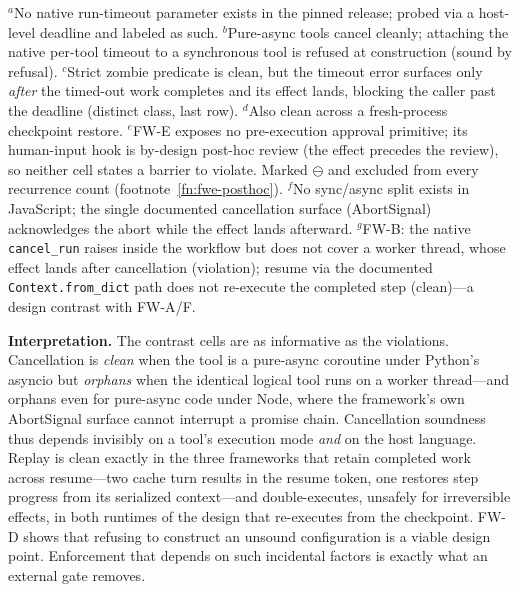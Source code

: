 \documentclass[10pt,journal,compsoc]{IEEEtran}
\begin{document}
\begin{table}[!t]
\smallskip
\raggedright\footnotesize
$^{a}$No native run-timeout parameter exists in the pinned release; probed via
a host-level deadline and labeled as such.
$^{b}$Pure-async tools cancel cleanly; attaching the native per-tool timeout to
a synchronous tool is refused at construction (sound by refusal).
$^{c}$Strict zombie predicate is clean, but the timeout error surfaces only
\emph{after} the timed-out work completes and its effect lands, blocking the
caller past the deadline (distinct class, last row).
$^{d}$Also clean across a fresh-process checkpoint restore.
$^{e}$\textsf{FW-E} exposes no pre-execution approval primitive; its human-input
hook is by-design post-hoc review (the effect precedes the review), so neither
cell states a barrier to violate. Marked $\ominus$ and excluded from every
recurrence count (footnote~\ref{fn:fwe-posthoc}).
$^{f}$No sync/async split exists in JavaScript; the single documented
cancellation surface (\textsf{AbortSignal}) acknowledges the abort while the
effect lands afterward.
$^{g}$\textsf{FW-B}: the native \texttt{cancel\_run} raises inside the
workflow but does not cover a worker thread, whose effect lands after
cancellation (violation); resume via the documented
\texttt{Context.from\_dict} path does not re-execute the completed step
(clean)---a design contrast with \textsf{FW-A}/\textsf{F}.
\end{table}

\noindent\textbf{Interpretation.} The contrast cells are as informative as the
violations. Cancellation is \emph{clean} when the tool is a pure-async coroutine
under Python's asyncio but \emph{orphans} when the identical logical tool runs
on a worker thread---and orphans even for pure-async code under Node, where the
framework's own \textsf{AbortSignal} surface cannot interrupt a promise chain.
Cancellation soundness thus depends invisibly on a tool's execution mode
\emph{and} on the host language. Replay is clean exactly in the three
frameworks that retain completed work across resume---two cache turn results
in the resume token, one restores step progress from its serialized
context---and double-executes, unsafely for irreversible effects, in both runtimes of the design that re-executes from
the checkpoint. \textsf{FW-D} shows that
refusing to construct an unsound configuration is a viable design point.
Enforcement that depends on such incidental factors is exactly what an external
gate removes.
\end{document}
